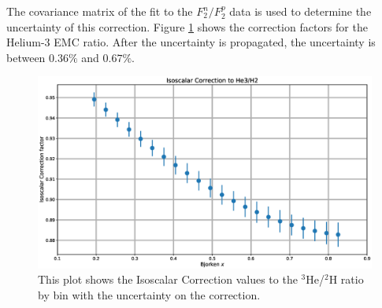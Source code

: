 The covariance matrix of the fit to the $F_2^n/F_2^p$ data is used to determine the uncertainty of this correction. Figure \ref{fig:isocor} shows the correction factors for the Helium-3 EMC ratio. After the uncertainty is propagated, the uncertainty is between $0.36\%$ and $0.67\%$.

\begin{figure}
	\includegraphics[width=\textwidth]{./analysis/fig/isocor.eps}
	\caption{This plot shows the Isoscalar Correction values to the $^3$He/$^2$H ratio by bin with the uncertainty on the correction.}
	\label{fig:isocor}
\end{figure}


